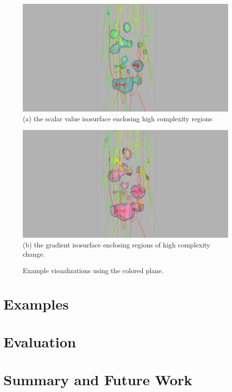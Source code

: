 \documentclass[journal]{vgtc}                %
\begin{document}
\begin{figure}[t]
	\centering
		\begin{minipage}{0.47\linewidth}
			\centering \small
			\includegraphics[height = 0.7\linewidth]{iso.png}\\(a) the scalar value isosurface enclosing high complexity regions\vspace{0.2em}
		\end{minipage}
		\begin{minipage}{0.47\linewidth}
			\centering \small
			\includegraphics[height = 0.7\linewidth]{grad.png}\\(b) the gradient isosurface enclosing regions of high complexity change. \vspace{0.2em}
		\end{minipage}
	\caption{Example visualizations using the colored plane.}
	\label{fig:iso}
\end{figure}

\section{Examples}

\section{Evaluation}

\section{Summary and Future Work}
\end{document}
